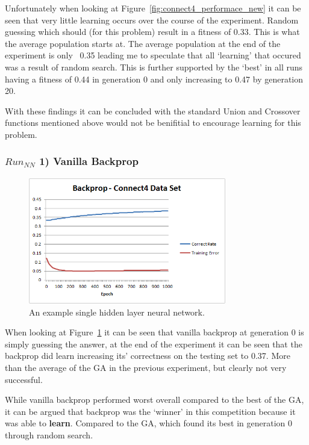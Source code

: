 \documentclass[journal]{IEEEtran}
\begin{document}
      Unfortunately when looking at Figure~\ref{fig:connect4_performace_new} it can be seen
    that very little learning occurs over the course of the experiment. Random guessing
    which should (for this problem) result in a fitness of 0.33. This is what the average
    population starts at. The average population at the end of the experiment is only ~0.35
    leading me to speculate that all `learning' that occured was a result of random search.
    This is further supported by the `best' in all runs having a fitness of 0.44 in generation 0 and only
    increasing to 0.47 by generation 20.

    With these findings it can be concluded with the standard Union and Crossover functions
    mentioned above would not be benifitial to encourage learning for this problem.

    \subsubsection*{$Run_{NN}$ 1) Vanilla Backprop}
      \begin{figure}[here]%
        \centering
        \includegraphics[width=3.4in]{brain_connect4}
        \caption{An example single hidden layer neural network.}
        \label{fig:brain_connect4}
      \end{figure}
    When looking at Figure~\ref{fig:brain_connect4} it can be seen that vanilla backprop
    at generation 0 is simply guessing the answer, at the end of the experiment it can be
    seen that the backprop did learn increasing its' correctness on the testing set to 0.37.
    More than the average of the GA in the previous experiment, but clearly not very successful.
    
    While vanilla backprop performed worst overall compared to the best of the GA, it can be argued that
    backprop was the `winner' in this competition because it was able to \textbf{learn}. Compared to
    the GA, which found its best in generation 0 through random search.
    
\end{document}
